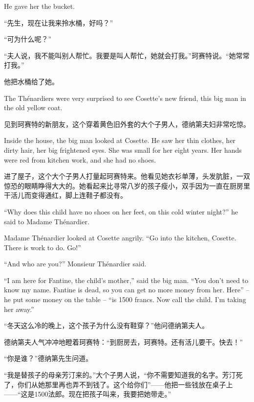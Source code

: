 \documentclass[fontset=ubuntu, zihao=5]{ctexart}
\begin{document}
\begin{paracol}{2}
  He gave her the bucket.

  \switchcolumn

  “先生，现在让我来拎水桶，好吗？”

  “可为什么呢？”

  “夫人说，我不能叫别人帮忙。我要是叫人帮忙，她就会打我。”珂赛特说。“她常常打我。”

  他把水桶给了她。

  \switchcolumn*

  The Thénardiers were very surprised to see Cosette's new friend, this big man in the old yellow coat.

  \switchcolumn

  见到珂赛特的新朋友，这个穿着黄色旧外套的大个子男人，德纳第夫妇非常吃惊。

  \switchcolumn*

  Inside the house, the big man looked at Cosette. He saw her thin clothes, her dirty hair, her big frightened eyes. She was small for her eight years. Her hands were red from kitchen work, and she had no shoes.

  \switchcolumn

  进了屋子，这个大个子男人打量起珂赛特来。他看见她衣衫单薄，头发肮脏，一双惊恐的眼睛睁得大大的。她看起来比寻常八岁的孩子瘦小，双手因为一直在厨房里干活儿而变得通红，脚上连鞋子都没有。

  \switchcolumn*

  ``Why does this child have no shoes on her feet, on this cold winter night?'' he said to Madame Thénardier.


  Madame Thénardier looked at Cosette angrily. ``Go into the kitchen, Cosette. There is work to do. Go!''


  ``And who are you?'' Monsieur Thénardier said.


  ``I am here for Fantine, the child's mother,'' said the big man. ``You don't need to know my name. Fantine is dead, so you can get no more money from her. Here'' – he put some money on the table – ``is 1500 francs. Now call the child. I'm taking her away.''

  \switchcolumn

  “冬天这么冷的晚上，这个孩子为什么没有鞋穿？”他问德纳第夫人。

  德纳第夫人气冲冲地瞪着珂赛特：“到厨房去，珂赛特。还有活儿要干。快去！”

  “你是谁？”德纳第先生问道。

  “我是替孩子的母亲芳汀来的。”大个子男人说，“你不需要知道我的名字。芳汀死了，你们从她那里再也弄不到钱了。这个给你们”——他把一些钱放在桌子上——“这是1500法郎。现在把孩子叫来，我要把她带走。”


\end{paracol}
\end{document}

